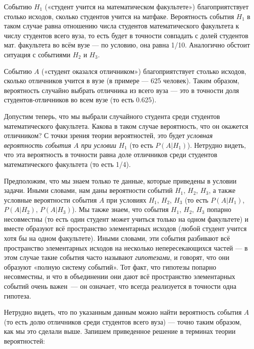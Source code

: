 \documentclass[11pt]{article}
\begin{document}
Событию $H_1$ («студент учится на математическом факультете») благоприятствует столько исходов, сколько студентов учится на матфаке. Вероятность события $H_1$ в таком случае равна отношению числа студентов математического факультета к числу студентов всего вуза, то есть будет в точности совпадать с долей студентов мат. факультета во всём вузе — по условию, она равна 1/10. Аналогично обстоит ситуация с событиями $H_2$ и $H_3$.

Событию $A$ («студент оказался отличником») благоприятствует столько исходов, сколько отличников учится в вузе (в примере — 625 человек). Таким образом, вероятность случайно выбрать отличника из всего вуза — это в точности доля студентов-отличников во всем вузе (то есть 0.625).

Допустим теперь, что мы выбрали случайного студента среди студентов математического факультета. Какова в таком случае вероятность, что он окажется отличником? С точки зрения теории вероятностей, это будет \emph{условная вероятность события $A$ при условии $H_1$} (то есть $P(A|H_1)$). Нетрудно видеть, что эта вероятность в точности равна доле отличников среди студентов математического факультета (то есть 1/4).

Предположим, что мы знаем только те данные, которые приведены в условии задачи. Иными словами, нам даны вероятности событий $H_1$, $H_2$, $H_3$, а также условные вероятности события $A$ при условиях $H_1$, $H_2$, $H_3$ (то есть $P(A|H_1)$, $P(A|H_2)$, $P(A|H_3)$). Мы также знаем, что события $H_1$, $H_2$, $H_3$ попарно несовместны (то есть один студент может учиться только на одном факультете) и вместе образуют всё пространство элементарных исходов (любой студент учится хотя бы на одном факультете). Иными словами, эти события разбивают всё пространство элементарных исходов на несколько непересекающихся частей — в этом случае такие события часто называют \emph{гипотезами}, и говорят, что они образуют «полную систему событий». Тот факт, что гипотезы попарно несовместны, и что в объединении они дают всё пространство элементарных событий очень важен~--- он означает, что всегда реализуется в точности одна гипотеза.

Нетрудно видеть, что по указанным данным можно найти вероятность события $A$ (то есть долю отличников среди студентов всего вуза) — точно таким образом, как мы это сделали выше. Запишем приведенное решение в терминах теории вероятностей:
\end{document}
